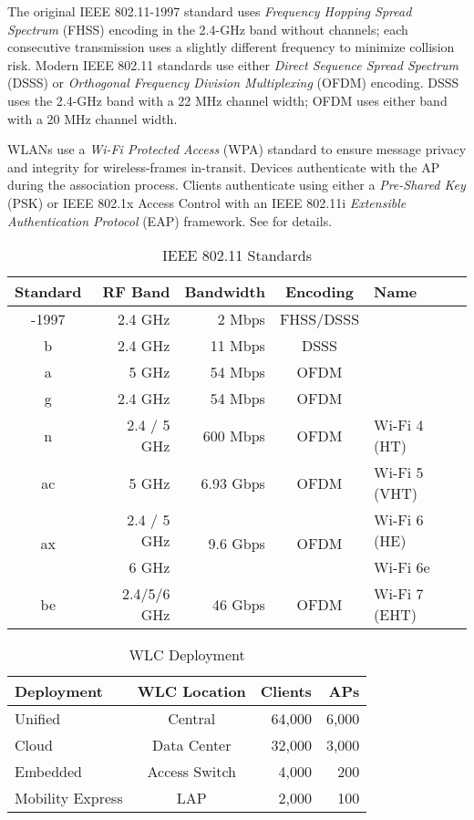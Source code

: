 \documentclass[12pt]{article}
\newcommand{\mr}[2]{\multirow{#1}{*}{#2}}
\begin{document}
	The original IEEE 802.11-1997 standard uses \textit{Frequency Hopping Spread Spectrum} (FHSS) encoding in the 2.4-GHz band without channels; each consecutive transmission uses a slightly different frequency to minimize collision risk. Modern IEEE 802.11 standards use either \textit{Direct Sequence Spread Spectrum} (DSSS) or \textit{Orthogonal Frequency Division Multiplexing} (OFDM) encoding. DSSS uses the 2.4-GHz band with a 22 MHz channel width; OFDM uses either band with a 20 MHz channel width.

	WLANs use a \textit{Wi-Fi Protected Access} (WPA) standard to ensure message privacy and integrity for wireless-frames in-transit. Devices authenticate with the AP during the association process. Clients authenticate using either a \textit{Pre-Shared Key} (PSK) or IEEE 802.1x Access Control with an IEEE 802.11i \textit{Extensible Authentication Protocol} (EAP) framework. See  for details.

	\begin{table}[H]
	\centering
	\caption{IEEE 802.11 Standards \label{tab:802.11 STANDARDS}}
	\begin{tabular}{@{} c r r c l @{}}\hline
	\textbf{Standard}	& \textbf{RF Band}	& \textbf{Bandwidth}	& \textbf{Encoding}	& \textbf{Name}\\\hline
	-1997			& 2.4 GHz			& 2 Mbps			& FHSS/DSSS\\\hline
	b 			& 2.4 GHz 			& 11 Mbps			& DSSS\\\hline
	a 			& 5 GHz			& 54 Mbps 			& OFDM\\\hline
	g 			& 2.4 GHz			& 54 Mbps 			& OFDM\\\hline
	n 			& 2.4 / 5 GHz		& 600 Mbps		& OFDM 			& Wi-Fi 4 (HT)\\\hline
	ac 			& 5 GHz			& 6.93 Gbps		& OFDM			& Wi-Fi 5 (VHT)\\\hline
	\mr{2}{ax}		& 2.4 / 5 GHz		& \mr{2}{9.6 Gbps}	& \mr{2}{OFDM}		& Wi-Fi 6 (HE)\\
				& 6 GHz			&				& 				& Wi-Fi 6e\\\hline
	be 			& 2.4/5/6 GHz		& 46 Gbps			& OFDM			& Wi-Fi 7 (EHT)\\\hline
	\end{tabular}\end{table}

	\begin{table}[H]
	\centering
	\caption{WLC Deployment \label{tab:WLC DEPLOYMENT}}
	\begin{tabular}{@{} l c r r @{}}\hline
	\textbf{Deployment}	& \textbf{WLC Location}	& \textbf{Clients}		& \textbf{APs}\\\hline
	Unified			& Central				& 64,000			& 6,000\\
	Cloud			& Data Center 			& 32,000			& 3,000\\
	Embedded			& Access Switch			& 4,000 			& 200\\
	Mobility Express		& LAP 				& 2,000			& 100\\\hline
	\end{tabular}\end{table}
\end{document}
